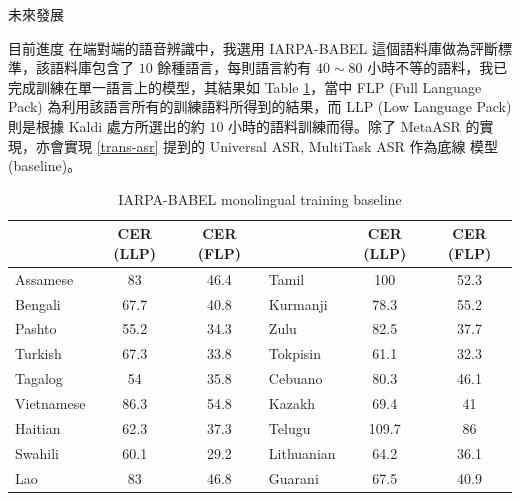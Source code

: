 \documentclass[12pt,UTF8,fntef]{article}
\begin{document}
\begin{section}{未來發展}
  \begin{subsection}{目前進度} \label{progress}
    在端對端的語音辨識中，我選用 IARPA-BABEL 這個語料庫做為評斷標準，該語料庫包含了 $10$ 餘種語言，每則語言約有 $40 \sim 80$ 小時不等的語料，我已完成訓練在單一語言上的模型，其結果如 Table \ref{table:monoASR}，當中 FLP (Full Language Pack) 為利用該語言所有的訓練語料所得到的結果，而 LLP (Low Language Pack) 則是根據 Kaldi 處方所選出的約 $10$ 小時的語料訓練而得。除了 MetaASR 的實現，亦會實現 \ref{trans-asr} 提到的 Universal ASR, MultiTask ASR 作為底線 模型 (baseline)。

\begin{table}[ht]
  \centering
\begin{tabular}{l|c|c|l|c|c|}
\cline{2-3} \cline{5-6}
\multicolumn{1}{c|}{}            & CER (LLP) & CER (FLP) & \multicolumn{1}{c|}{} & CER (LLP) & CER (FLP) \\ \hline
\multicolumn{1}{|l|}{Assamese}   & 83        & 46.4      & Tamil                 & 100       & 52.3      \\ \hline
\multicolumn{1}{|l|}{Bengali}    & 67.7      & 40.8      & Kurmanji              & 78.3      & 55.2      \\ \hline
\multicolumn{1}{|l|}{Pashto}     & 55.2      & 34.3      & Zulu                  & 82.5      & 37.7      \\ \hline
\multicolumn{1}{|l|}{Turkish}    & 67.3      & 33.8      & Tokpisin              & 61.1      & 32.3      \\ \hline
\multicolumn{1}{|l|}{Tagalog}    & 54        & 35.8      & Cebuano               & 80.3      & 46.1      \\ \hline
\multicolumn{1}{|l|}{Vietnamese} & 86.3      & 54.8      & Kazakh                & 69.4      & 41        \\ \hline
\multicolumn{1}{|l|}{Haitian}    & 62.3      & 37.3      & Telugu                & 109.7     & 86        \\ \hline
\multicolumn{1}{|l|}{Swahili}    & 60.1      & 29.2      & Lithuanian            & 64.2      & 36.1      \\ \hline
\multicolumn{1}{|l|}{Lao}        & 83        & 46.8      & Guarani               & 67.5      & 40.9      \\ \hline
\end{tabular}
\caption{IARPA-BABEL monolingual training baseline}
\label{table:monoASR}
\end{table}
  \end{subsection}


\end{section}
\end{document}
